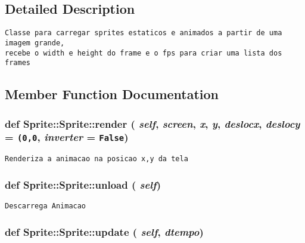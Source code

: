 \subsection{Detailed Description}


\begin{footnotesize}\begin{verbatim}Classe para carregar sprites estaticos e animados a partir de uma imagem grande,
recebe o width e height do frame e o fps para criar uma lista dos frames\end{verbatim}
\end{footnotesize}
 

\subsection{Member Function Documentation}
\hypertarget{class_sprite_1_1_sprite_cd5216aed6dee680486ec2499564773b}{
\subsubsection[{render}]{\setlength{\rightskip}{0pt plus 5cm}def Sprite::Sprite::render ( {\em self}, \/   {\em screen}, \/   {\em x}, \/   {\em y}, \/   {\em deslocx}, \/   {\em deslocy} = {\tt (0,0}, \/   {\em inverter} = {\tt False})}}
\label{class_sprite_1_1_sprite_cd5216aed6dee680486ec2499564773b}




\begin{footnotesize}\begin{verbatim}Renderiza a animacao na posicao x,y da tela\end{verbatim}
\end{footnotesize}
 \hypertarget{class_sprite_1_1_sprite_db1c8c82bc9688b5b5047730143d17ae}{
\subsubsection[{unload}]{\setlength{\rightskip}{0pt plus 5cm}def Sprite::Sprite::unload ( {\em self})}}
\label{class_sprite_1_1_sprite_db1c8c82bc9688b5b5047730143d17ae}




\begin{footnotesize}\begin{verbatim}Descarrega Animacao\end{verbatim}
\end{footnotesize}
 \hypertarget{class_sprite_1_1_sprite_f994dc09683ba02a311ac4b3bcd78f38}{
\subsubsection[{update}]{\setlength{\rightskip}{0pt plus 5cm}def Sprite::Sprite::update ( {\em self}, \/   {\em dtempo})}}
\label{class_sprite_1_1_sprite_f994dc09683ba02a311ac4b3bcd78f38}




